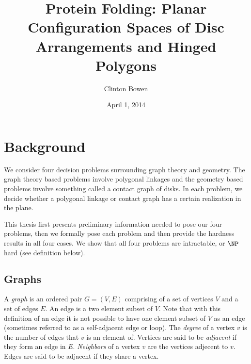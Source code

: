 \documentclass[10pt]{CSUNthesis}
\author{Clinton Bowen}
\title{Protein Folding: Planar Configuration Spaces of Disc Arrangements and
Hinged Polygons}
\date{April 1, 2014}
\theoremstyle{plain}%
\theoremstyle{definition}
\theoremstyle{remark}
\newcommand{\curlybraces}[1]{\left\lbrace #1 \right\rbrace}
\begin{document}
\chapter{Background}
%
%
We consider four decision problems surrounding graph theory and geometry. 
The graph theory based problems involve polygonal linkages and the geometry based problems involve something called a contact graph of disks.  
In each problem, we decide whether a polygonal linkage or contact graph has a certain realization in the plane.

This thesis first presents preliminary information needed to pose our four problems, then we formally pose each problem and then provide the hardness results in all four cases.
We show that all four problems are intractable, or $\NP$ hard (see definition below). 
\section{Graphs}
A \textit{graph} is an ordered pair $G = (V,E)$ comprising of a set of vertices $V$ and a set of edges $E$.  
An edge is a two element subset of $V$.
Note that with this definition of an edge it is not possible to have one element subset of $V$ as an edge (sometimes referred to as a self-adjacent edge or loop).
The \textit{degree} of a vertex $v$ is the number of edges that $v$ is an element of.
Vertices are said to be \textit{adjacent} if they form an edge in $E$.  
\textit{Neighbors} of a vertex $v$ are the vertices adjecent to $v$.
Edges are said to be adjacent if they share a vertex.  
\end{document}

